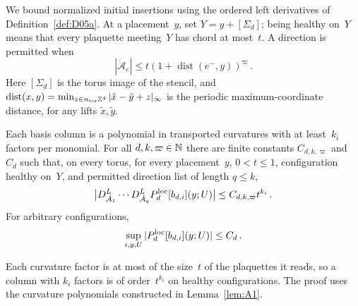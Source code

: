 We bound normalized initial insertions using the ordered left derivatives of Definition~\ref{def:D05a}. At a placement~$y$, set $Y=y+[\Sigma_d]$; being healthy on~$Y$ means that every plaquette meeting~$Y$ has chord at most~$t$. A direction is permitted when
\begin{equation*}
|\dot{\mathcal A}_e|\le t(1+\operatorname{dist}(e^-,y))^\varpi\,.
\end{equation*}
Here $[\Sigma_d]$ is the torus image of the stencil, and $\operatorname{dist}(x,y)=\min_{z\in n_{\rm tor}\mathbb{Z}^4}|\tilde x-\tilde y+z|_\infty$ is the periodic maximum-coordinate distance, for any lifts $\tilde x,\tilde y$.
\begin{lemma}\label{lem:A-bounds}
Each basis column is a polynomial in transported curvatures with at least~$k_i$ factors per monomial. For all $d,k,\varpi\in\mathbb{N}$ there are finite constants $C_{d,k,\varpi}$ and $C_d$ such that, on every torus, for every placement~$y$, $0<t\le1$, configuration healthy on~$Y$, and permitted direction list of length $q\le k$,
\begin{equation}\label{eq:A-section-bound}
\bigl|D^L_{\dot{\mathcal A}_1}\cdots D^L_{\dot{\mathcal A}_q}
P_{d}^{\mathrm{loc}}[b_{d,i}](y;U)\bigr|\le C_{d,k,\varpi}t^{k_i}\,.
\end{equation}
For arbitrary configurations,
\begin{equation}\label{eq:A-global-bound}
\sup_{i,y,U}|P_{d}^{\mathrm{loc}}[b_{d,i}](y;U)|\le C_d\,.
\end{equation}
\end{lemma}
Each curvature factor is at most of the size~$t$ of the plaquettes it reads, so a column with $k_i$ factors is of order~$t^{k_i}$ on healthy configurations. The proof uses the curvature polynomials constructed in Lemma~\ref{lem:A1}.
